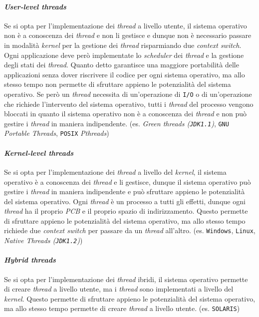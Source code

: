            \paragraph{\textit{User-level threads}} Se si opta per l'implementazione dei \textit{thread} a livello utente, il sistema operativo non è a conoscenza dei \textit{thread} e non li gestisce e dunque non è necessario passare in modalità \textit{kernel} per la gestione dei \textit{thread} risparmiando due \textit{context switch}. Ogni applicazione deve però implementate lo \textit{scheduler} dei \textit{thread} e la gestione degli stati dei \textit{thread}. Quanto detto garantisce una maggiore portabilità delle applicazioni senza dover riscrivere il codice per ogni sistema operativo, ma allo stesso tempo non permette di sfruttare appieno le potenzialità del sistema operativo. Se però un \textit{thread} necessita di un'operazione di \texttt{I/O} o di un'operazione che richiede l'intervento del sistema operativo, tutti i \textit{thread} del processo vengono bloccati in quanto il sistema operativo non è a conoscenza dei \textit{thread} e non può gestire i \textit{thread} in maniera indipendente. (es. \textit{Green threads (\texttt{JDK1.1})}, \texttt{GNU} \textit{Portable Threads}, \texttt{POSIX} \textit{Pthreads})
            \paragraph{\textit{Kernel-level threads}} Se si opta per l'implementazione dei \textit{thread} a livello del \textit{kernel}, il sistema operativo è a conoscenza dei \textit{thread} e li gestisce, dunque il sistema operativo può gestire i \textit{thread} in maniera indipendente e può sfruttare appieno le potenzialità del sistema operativo. Ogni \textit{thread} è un processo a tutti gli effetti, dunque ogni \textit{thread} ha il proprio \textit{PCB} e il proprio spazio di indirizzamento. Questo permette di sfruttare appieno le potenzialità del sistema operativo, ma allo stesso tempo richiede due \textit{context switch} per passare da un \textit{thread} all'altro. (es. \texttt{Windows}, \texttt{Linux}, \textit{Native Threads (\texttt{JDK1.2})})
            \paragraph{\textit{Hybrid threads}} Se si opta per l'implementazione dei \textit{thread} ibridi, il sistema operativo permette di creare \textit{thread} a livello utente, ma i \textit{thread} sono implementati a livello del \textit{kernel}. Questo permette di sfruttare appieno le potenzialità del sistema operativo, ma allo stesso tempo permette di creare \textit{thread} a livello utente. (es. \texttt{SOLARIS})
